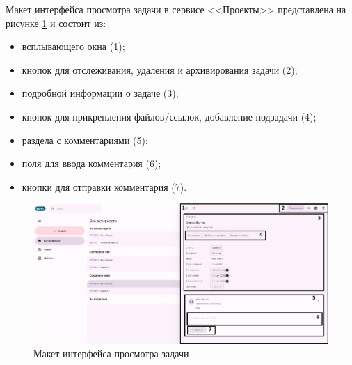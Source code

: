 Макет интерфейса просмотра задачи в сервисе <<Проекты>> представлена на рисунке \ref{templ:image7d} и состоит из:
\begin{itemize}
  \item всплывающего окна (1);
  \item кнопок для отслеживания, удаления и архивирования задачи (2);
  \item подробной информации о задаче (3);
  \item кнопок для прикрепления файлов/ссылок, добавление подзадачи (4);
  \item раздела с комментариями (5);
  \item поля для ввода комментария (6);
  \item кнопки для отправки комментария (7).
\end{itemize}
\begin{figure}[H]
	\centering
	\includegraphics[width=1\linewidth]{images/проекты4}
	\caption{Макет интерфейса просмотра задачи}
	\label{templ:image7d}
\end{figure}

